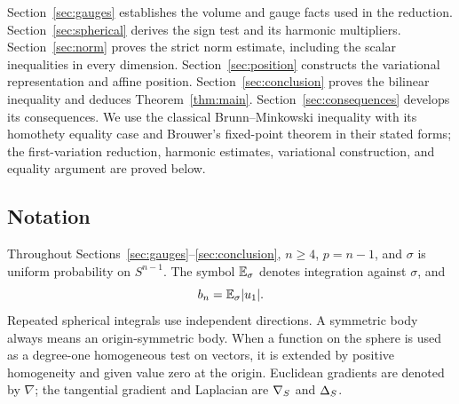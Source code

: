 Section~\ref{sec:gauges} establishes the volume and gauge facts used in
the reduction. Section~\ref{sec:spherical} derives the sign test and
its harmonic multipliers. Section~\ref{sec:norm} proves the strict norm
estimate, including the scalar inequalities in every dimension.
Section~\ref{sec:position} constructs the variational representation
and affine position. Section~\ref{sec:conclusion} proves the bilinear
inequality and deduces Theorem~\ref{thm:main}.
Section~\ref{sec:consequences} develops its consequences. We use the classical
Brunn--Minkowski inequality with its homothety equality case and
Brouwer's fixed-point theorem in their stated forms; the first-variation
reduction, harmonic estimates, variational construction, and equality
argument are proved below.

\subsection*{Notation}

Throughout Sections~\ref{sec:gauges}--\ref{sec:conclusion}, $n\ge4$,
$p=n-1$, and $\sigma$ is uniform probability on
$S^{n-1}$. The symbol $\mathbb E_{\sigma}$ denotes integration against $\sigma$, and
\[
 b_n=\mathbb E_{\sigma}|u_1|.
\]
Repeated spherical integrals use independent directions.
A symmetric body always means an origin-symmetric body.
When a function on the sphere is used as a degree-one homogeneous test
on vectors, it is extended by positive homogeneity and given value zero
at the origin. Euclidean gradients are denoted by $\nabla$; the
tangential gradient and Laplacian are $\nabla_S$ and $\Delta_S$.
